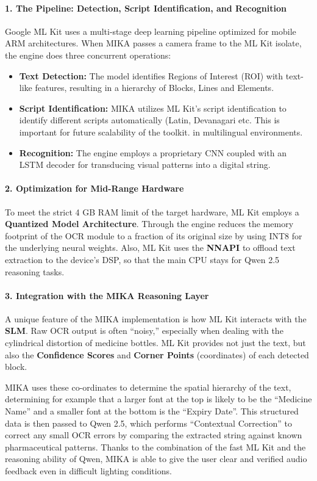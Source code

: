 \documentclass[12pt,a4paper]{report}
\begin{document}
\paragraph{1. The Pipeline: Detection, Script Identification, and Recognition}
Google ML Kit uses a multi-stage deep learning pipeline optimized for mobile ARM architectures. When MIKA passes a camera frame to the ML Kit isolate, the engine does three concurrent operations:\begin{itemize}
    \item \textbf{Text Detection:} The model identifies Regions of Interest (ROI) with text-like features, resulting in a hierarchy of Blocks, Lines and Elements.
    \item \textbf{Script Identification:} MIKA utilizes ML Kit’s script identification to identify different scripts automatically (Latin, Devanagari etc. This is important for future scalability of the toolkit. in multilingual environments.
    \item \textbf{Recognition:} The engine employs a proprietary CNN coupled with an LSTM decoder for transducing visual patterns into a digital string.
\end{itemize}
 
\paragraph{2. Optimization for Mid-Range Hardware}
To meet the strict 4 GB RAM limit of the target hardware, ML Kit employs a \textbf{Quantized Model Architecture}. Through the engine reduces the memory footprint of the OCR module to a fraction of its original size by using INT8 for the underlying neural weights. Also, ML Kit uses the \textbf{NNAPI} to offload text extraction to the device's DSP, so that the main CPU stays for Qwen 2.5 reasoning tasks.

\paragraph{3. Integration with the MIKA Reasoning Layer}
A unique feature of the MIKA implementation is how ML Kit interacts with the \textbf{SLM}. Raw OCR output is often ``noisy,'' especially when dealing with the cylindrical distortion of medicine bottles. ML Kit provides not just the text, but also the \textbf{Confidence Scores} and \textbf{Corner Points} (coordinates) of each detected block. 
 
\noindent MIKA uses these co-ordinates to determine the spatial hierarchy of the text, determining for example that a larger font at the top is likely to be the “Medicine Name” and a smaller font at the bottom is the “Expiry Date”. This structured data is then passed to Qwen 2.5, which performs “Contextual Correction” to correct any small OCR errors by comparing the extracted string against known pharmaceutical patterns. Thanks to the combination of the fast ML Kit and the reasoning ability of Qwen, MIKA is able to give the user clear and verified audio feedback even in difficult lighting conditions.
 
\end{document}
